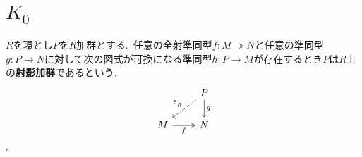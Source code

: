 \section{$K_0$}

\begin{definition}
$R$を環とし$P$を$R$加群とする.\ 任意の全射準同型$f \colon M \twoheadrightarrow N$と任意の準同型$g \colon P \to N$に対して次の図式が可換になる準同型$h \colon P \to M$が存在するとき$P$は$R$上の\textbf{射影加群}であるという.
\[\begin{tikzcd}
	& P \\
	M & N
	\arrow["{{^\exists}h}"', dashed, from=1-2, to=2-1]
	\arrow["g", from=1-2, to=2-2]
	\arrow["f"', two heads, from=2-1, to=2-2]
\end{tikzcd}\]
\hfill $\square$
\end{definition}